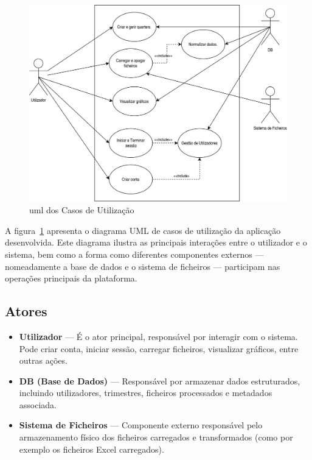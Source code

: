 \begin{figure}[h]
\centering
\includegraphics[max width=\textwidth]{./img/usecase_uml}
\caption{\gls{uml} dos Casos de Utilização}
\label{fig:umlCasosUtilizacao}
\end{figure}

A figura~\ref{fig:umlCasosUtilizacao} apresenta o diagrama UML de casos de utilização da aplicação desenvolvida. Este diagrama ilustra as principais interações entre o utilizador e o sistema, bem como a forma como diferentes componentes externos — nomeadamente a base de dados e o sistema de ficheiros — participam nas operações principais da plataforma.

\subsection*{Atores}
\begin{itemize}
    \item \textbf{Utilizador} — É o ator principal, responsável por interagir com o sistema. Pode criar conta, iniciar sessão, carregar ficheiros, visualizar gráficos, entre outras ações.
    \item \textbf{DB (Base de Dados)} — Responsável por armazenar dados estruturados, incluindo utilizadores, trimestres, ficheiros processados e metadados associada.
    \item \textbf{Sistema de Ficheiros} — Componente externo responsável pelo armazenamento físico dos ficheiros carregados e transformados (como por exemplo os ficheiros Excel carregados).
\end{itemize}

